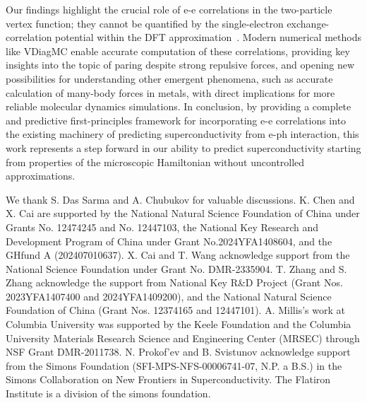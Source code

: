 \documentclass[%
 reprint,
superscriptaddress,
 amsmath,amssymb,
 aps,
prx,
]{revtex4-2}
\begin{document}
Our findings highlight the crucial role of e-e 
correlations in the two-particle vertex function; they 
cannot be quantified by the single-electron exchange-correlation potential within the DFT approximation~\cite{kohn1964,kohn1965}. Modern numerical methods like VDiagMC enable accurate computation of these correlations, providing key insights into the topic of paring despite strong repulsive forces, and opening new possibilities for understanding other emergent phenomena, such as accurate calculation of many-body forces in metals, with direct implications for more reliable molecular dynamics simulations.
In conclusion, by providing a complete and predictive first-principles framework for incorporating e-e correlations into the existing machinery
of predicting superconductivity from e-ph interaction, 
this work represents a step forward in our ability to predict superconductivity starting from properties of the microscopic Hamiltonian
without uncontrolled approximations.


\begin{acknowledgments}
We thank S. Das Sarma and A. Chubukov for valuable discussions. 
K. Chen and X. Cai are supported by the National Natural Science Foundation of China under Grants No. 12474245 and No. 12447103, the National Key Research and Development Program of China under Grant No.2024YFA1408604, and the GHfund A (202407010637).
X. Cai and T. Wang acknowledge support from the National Science Foundation under Grant No. DMR-2335904. 
T. Zhang and S. Zhang acknowledge the support from National Key R\&D Project (Grant Nos. 2023YFA1407400 and 2024YFA1409200), and the National Natural Science Foundation of China (Grant Nos. 12374165 and 12447101).
A. Millis's work at Columbia University was supported by the Keele Foundation and the Columbia University Materials Research Science and Engineering Center (MRSEC) through NSF Grant DMR-2011738.
{N. Prokof'ev and B. Svistunov acknowledge support from the Simons Foundation (SFI-MPS-NFS-00006741-07, N.P. a B.S.) in the Simons Collaboration on New Frontiers in Superconductivity.}
The Flatiron Institute is a division of the simons foundation.
\end{acknowledgments}

\end{document}
